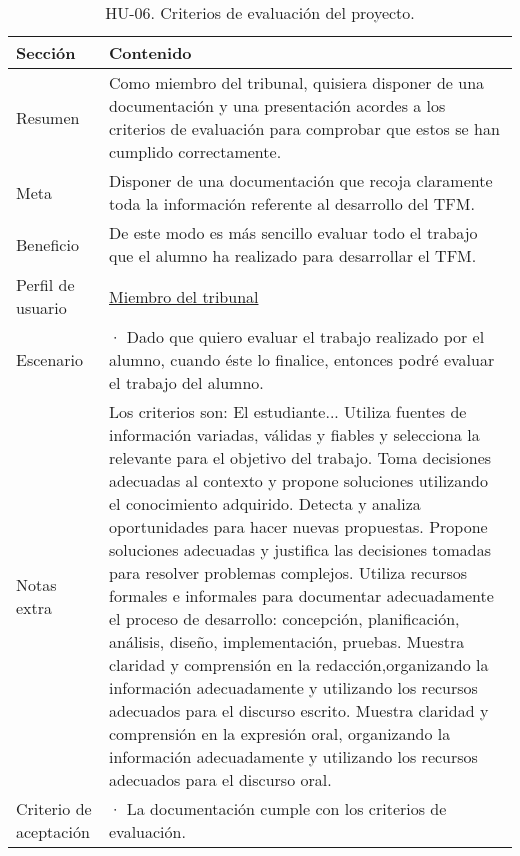 \FloatBarrier
\begin{table}[h]
    \centering
    \def\arraystretch{1.25}
    \begin{adjustbox}{max width=\textwidth}
    \begin{tabularx}{\textwidth}{|l|L|}
    \hline
        \textbf{Sección} & \textbf{Contenido} \\ \hline
    \hline
        Resumen & Como miembro del tribunal, quisiera disponer de una documentación y una presentación acordes a los criterios de evaluación para comprobar que estos se han cumplido correctamente. \\ \hline
        Meta & Disponer de una documentación que recoja claramente toda la información referente al desarrollo del TFM. \\ \hline
        Beneficio & De este modo es más sencillo evaluar todo el trabajo que el alumno ha realizado para desarrollar el TFM. \\ \hline
        Perfil de usuario & \hyperref[sec:personaMiembroTribunal]{Miembro del tribunal} \\ \hline
        Escenario & · Dado que quiero evaluar el trabajo realizado por el alumno, cuando éste lo finalice, entonces podré evaluar el trabajo del alumno. \\ \hline
        Notas extra & Los criterios son: El estudiante... Utiliza fuentes de información variadas, válidas y fiables y selecciona la relevante para el objetivo del trabajo. Toma decisiones adecuadas al contexto y propone soluciones utilizando el conocimiento adquirido. Detecta y analiza oportunidades para hacer nuevas propuestas. Propone soluciones adecuadas y justifica las decisiones tomadas para resolver problemas complejos. Utiliza recursos formales e informales para documentar adecuadamente el proceso de desarrollo: concepción, planificación, análisis, diseño, implementación, pruebas. Muestra claridad y comprensión en la redacción,organizando la información adecuadamente y utilizando los recursos adecuados para el discurso escrito. Muestra claridad y comprensión en la expresión oral, organizando la información adecuadamente y utilizando los recursos adecuados para el discurso oral. \\ \hline
        Criterio de aceptación & · La documentación cumple con los criterios de evaluación. \\ \hline
    \end{tabularx}
    \end{adjustbox}
    \caption{HU-06. Criterios de evaluación del proyecto.}
\end{table}
\FloatBarrier

